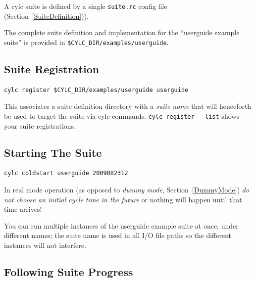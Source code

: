 \documentclass[11pt,a4paper]{article}
\begin{document}
A cylc suite is defined by a single \lstinline=suite.rc= config file
(Section~\ref{SuiteDefinition})).

The complete suite definition and implementation for the ``userguide
example suite'' is provided in \lstinline=$CYLC_DIR/examples/userguide=. 

\subsection{Suite Registration}
\label{QuickSuiteRegistration}

\begin{lstlisting}
cylc register $CYLC_DIR/examples/userguide userguide 
\end{lstlisting}

This associates a suite definition directory with a {\em suite name}
that will henceforth be used to target the suite via cylc commands. 
\lstinline=cylc register --list= shows your suite registrations.

\subsection{Starting The Suite}
\label{QuickStartingTheSuite}

\begin{lstlisting}
cylc coldstart userguide 2009082312
\end{lstlisting}


In real mode operation (as opposed to {\em dummy mode},
Section~\ref{DummyMode}) {\em do not choose an initial cycle time in the
future} or nothing will happen until that time arrives!

You can run multiple instances of the userguide example suite at once,
under different names; the suite name is used in all I/O file paths so
the different instances will not interfere. 

\subsection{Following Suite Progress}
\label{QuickFollowingSuiteProgress}
\end{document}
